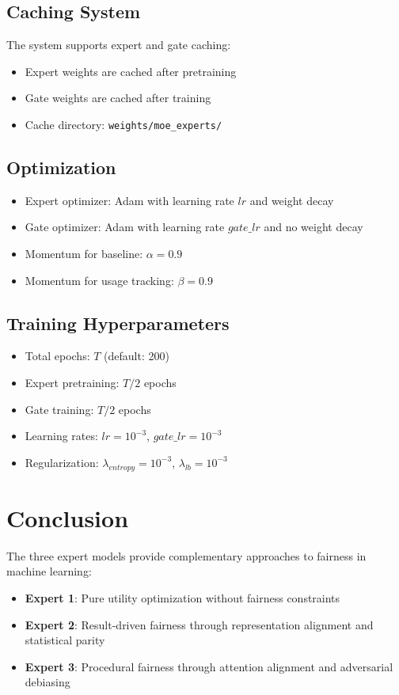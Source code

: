 \documentclass[11pt]{article}
\begin{document}
\subsection{Caching System}
The system supports expert and gate caching:
\begin{itemize}
    \item Expert weights are cached after pretraining
    \item Gate weights are cached after training
    \item Cache directory: \texttt{weights/moe\_experts/}
\end{itemize}

\subsection{Optimization}
\begin{itemize}
    \item Expert optimizer: Adam with learning rate $lr$ and weight decay
    \item Gate optimizer: Adam with learning rate $gate\_lr$ and no weight decay
    \item Momentum for baseline: $\alpha = 0.9$
    \item Momentum for usage tracking: $\beta = 0.9$
\end{itemize}

\subsection{Training Hyperparameters}
\begin{itemize}
    \item Total epochs: $T$ (default: 200)
    \item Expert pretraining: $T/2$ epochs
    \item Gate training: $T/2$ epochs
    \item Learning rates: $lr = 10^{-3}$, $gate\_lr = 10^{-3}$
    \item Regularization: $\lambda_{entropy} = 10^{-3}$, $\lambda_{lb} = 10^{-3}$
\end{itemize}

\section{Conclusion}

The three expert models provide complementary approaches to fairness in machine learning:

\begin{itemize}
    \item \textbf{Expert 1}: Pure utility optimization without fairness constraints
    \item \textbf{Expert 2}: Result-driven fairness through representation alignment and statistical parity
    \item \textbf{Expert 3}: Procedural fairness through attention alignment and adversarial debiasing
\end{itemize}
\end{document}
